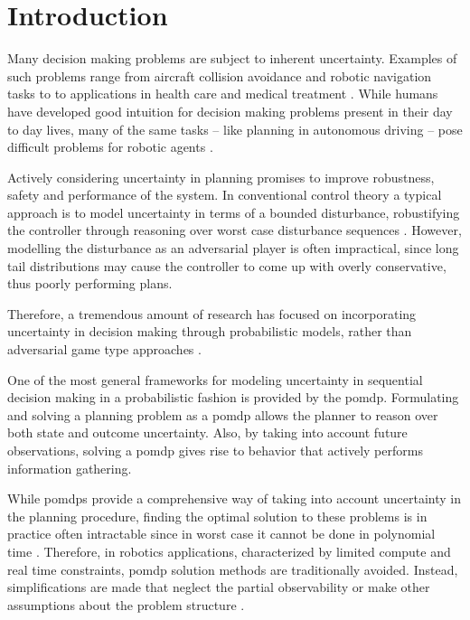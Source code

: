 \chapter{Introduction}\label{chap:introduction}


Many decision making problems are subject to inherent uncertainty. Examples of
such problems range from aircraft collision avoidance and robotic navigation
tasks to to applications in health care and medical treatment
\cite{kochenderfer2012next, bandyopadhyay2013intention, pineau2003towards,
schaefer2005modeling}. While humans have developed good intuition for decision
making problems present in their day to day lives, many of the same tasks --
like planning in autonomous driving -- pose difficult problems for robotic
agents \cite{levinson2011towards}.

Actively considering uncertainty in planning promises to improve robustness,
safety and performance of the system. In conventional control theory a typical
approach is to model uncertainty in terms of a bounded disturbance,
robustifying the controller through reasoning over worst case disturbance
sequences \cite{petersen2012robust}. However, modelling the disturbance as an
adversarial player is often impractical, since long tail distributions may
cause the controller to come up with overly conservative, thus poorly
performing plans.

Therefore, a tremendous amount of research has focused on incorporating
uncertainty in decision making through probabilistic models, rather than
adversarial game type approaches \cite{roy1999coastal, amato2015planning,
fisac2018probabilistically, choudhury2019dynamic}.

One of the most general frameworks for modeling uncertainty in sequential
decision making in a probabilistic fashion is provided by the \ac{pomdp}.
Formulating and solving a planning problem as a \ac{pomdp} allows the planner
to reason over both state and outcome uncertainty. Also, by taking into
account future observations, solving a \ac{pomdp} gives rise to behavior that actively performs information gathering.

While \acp{pomdp} provide a comprehensive way of taking into account
uncertainty in the planning procedure, finding the optimal solution to these
problems is in practice often intractable since in worst case it cannot be
done in polynomial time \cite{papadimitriou1987complexity}. Therefore, in
robotics applications, characterized by limited compute and real time
constraints, \ac{pomdp} solution methods are traditionally avoided. Instead,
simplifications are made that neglect the partial observability or make other
assumptions about the problem structure \cite{sadigh2016information,
fisac2018probabilistically}.

